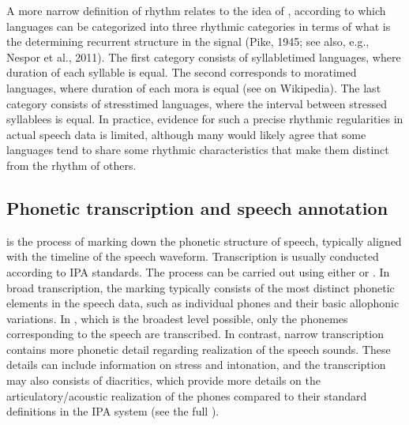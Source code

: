 \documentclass[letterpaper,10pt,english]{jupyterBook}
\begin{document}
\sphinxAtStartPar
A more narrow definition of rhythm relates to the idea of ,
according to which languages can be categorized into three rhythmic
categories in terms of what is the determining recurrent structure in
the signal (Pike, 1945; see also, e.g., Nespor et al., 2011). The first
category consists of syllable\sphinxhyphen{}timed languages, where duration of each
syllable is equal. The second corresponds to mora\sphinxhyphen{}timed languages, where
duration of each mora is equal (see
 on Wikipedia).
The last category consists of stress\sphinxhyphen{}timed languages, where the interval
between stressed syllablees is equal. In practice, evidence for such a
precise rhythmic regularities in actual speech data is limited, although
many would likely agree that some languages tend to share some rhythmic
characteristics that make them distinct from the rhythm of others.


\subsection{Phonetic transcription and speech annotation}
\label{\detokenize{Introduction/Linguistic_structure_of_speech:phonetic-transcription-and-speech-annotation}}
\sphinxAtStartPar
{} is the process of marking down the phonetic
structure of speech, typically aligned with the timeline of the speech
waveform. Transcription is usually conducted according to IPA standards.
The process can be carried out using either  or
. In broad transcription, the marking typically
consists of the most distinct phonetic elements in the speech data, such
as individual phones and their basic allophonic variations. In , which is the broadest level possible, only the phonemes
corresponding to the speech are transcribed. In contrast, narrow
transcription contains more phonetic detail regarding realization of the
speech sounds. These details can include information on stress and
intonation, and the transcription may also consists of diacritics, which
provide more details on the articulatory/acoustic realization of the
phones compared to their standard definitions in the IPA system (see the
full ).
\end{document}
